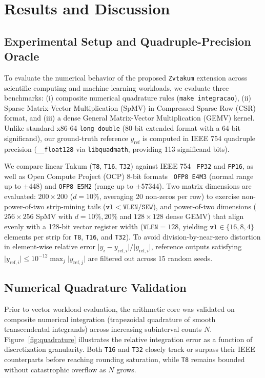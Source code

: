 \documentclass[conference]{IEEEtran}
\begin{document}
\section{Results and Discussion}
\label{sec:results}

\subsection{Experimental Setup and Quadruple-Precision Oracle}
To evaluate the numerical behavior of the proposed \texttt{Zvtakum} extension across scientific computing and machine learning workloads, we evaluate three benchmarks: (i) composite numerical quadrature rules (\texttt{make integracao}), (ii) Sparse Matrix-Vector Multiplication (SpMV) in Compressed Sparse Row (CSR) format, and (iii) a dense General Matrix-Vector Multiplication (GEMV) kernel. Unlike standard x86-64 \texttt{long double} (80-bit extended format with a 64-bit significand), our ground-truth reference $y_{\text{ref}}$ is computed in IEEE 754 quadruple precision (\texttt{\_\_float128} via \texttt{libquadmath}, providing 113 significand bits).

We compare linear Takum (\texttt{T8}, \texttt{T16}, \texttt{T32}) against IEEE 754~\cite{ieee754} \texttt{FP32} and \texttt{FP16}, as well as Open Compute Project (OCP) 8-bit formats~\cite{ocp_fp8} \texttt{OFP8 E4M3} (normal range up to $\pm 448$) and \texttt{OFP8 E5M2} (range up to $\pm 57344$). Two matrix dimensions are evaluated: $200 \times 200$ ($d = 10\%$, averaging 20 non-zeros per row) to exercise non-power-of-two strip-mining tails ($\texttt{vl} < \texttt{VLEN}/\texttt{SEW}$), and power-of-two dimensions ($256 \times 256$ SpMV with $d = 10\%, 20\%$ and $128 \times 128$ dense GEMV) that align evenly with a 128-bit vector register width ($\texttt{VLEN} = 128$, yielding $\texttt{vl} \in \{16, 8, 4\}$ elements per strip for \texttt{T8}, \texttt{T16}, and \texttt{T32}). To avoid division-by-near-zero distortion in element-wise relative error $\vert{}y_i - y_{\text{ref},i}\vert{} / \vert{}y_{\text{ref},i}\vert{}$, reference outputs satisfying $\vert{}y_{\text{ref},i}\vert{} \le 10^{-12} \max_j \vert{}y_{\text{ref},j}\vert{}$ are filtered out across 15 random seeds.

\subsection{Numerical Quadrature Validation}
Prior to vector workload evaluation, the arithmetic core was validated on composite numerical integration (trapezoidal quadrature of smooth transcendental integrands) across increasing subinterval counts $N$. Figure~\ref{fig:quadrature} illustrates the relative integration error as a function of discretization granularity. Both \texttt{T16} and \texttt{T32} closely track or surpass their IEEE counterparts before reaching rounding saturation, while \texttt{T8} remains bounded without catastrophic overflow as $N$ grows.
\end{document}
